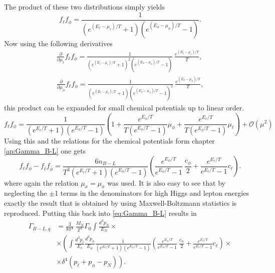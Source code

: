 The product of these two distributions simply yields
\begin{equation*}
	f_\ell f_\phi=\frac{1}{\left(e^{\left(E_\ell-\mu_\ell\right)/T}+1\right)\left(e^{\left(E_\phi-\mu_\phi\right)/T}-1\right)}.
\end{equation*}
Now using the following derivatives
\begin{align*}
	\frac{\partial}{\partial\mu_\ell}f_\ell f_\phi=\frac{1}{\left(e^{\left(E_\ell-\mu_\ell\right)/T}+1\right)^2\left(e^{\left(E_\phi-\mu_\phi\right)/T}-1\right)}\:\frac{e^{\left(E_\ell-\mu_\ell\right)/T}}{T},\\
	\frac{\partial}{\partial\mu_\phi}f_\ell f_\phi=\frac{1}{\left(e^{\left(E_\ell-\mu_\ell\right)/T}+1\right)\left(e^{\left(E_\phi-\mu_\phi\right)/T}-1\right)^2}\:\frac{e^{\left(E_\phi-\mu_\phi\right)/T}}{T},
\end{align*}
this product can be expanded for small chemical potentials up to linear order.
\begin{equation*}
	f_\ell f_\phi=\frac{1}{\left(e^{E_\ell/T}+1\right)\left(e^{E_\phi/T}-1\right)}\left(1+\frac{e^{E_\phi/T}}{T\left(e^{E_\phi/T}-1\right)}\mu_\phi+\frac{e^{E_\ell/T}}{T\left(e^{E_\ell/T}-1\right)}\mu_\ell\right)+\mathcal{O}(\mu^2)
\end{equation*}
Using this and the relations for the chemical potentials form chapter \ref{ap:Gamma_B-L} one gets
\begin{equation*}
	f_\ell f_\phi-f_{\bar{\ell}} f_{\bar{\phi}}=\frac{6n_{B-L}}{T^3\left(e^{E_\ell/T}+1\right)\left(e^{E_\phi/T}-1\right)}\left(\frac{e^{E_\phi/T}}{e^{E_\phi/T}-1}\:\frac{c_\phi}{2}+\frac{e^{E_\ell/T}}{e^{E_\ell/T}-1}c_\ell\right).
\end{equation*}
where again the relation $\mu_x=\mu_{\bar{x}}$ was used. \newline\indent
It is also easy to see that by neglecting the $\pm$1 terms in the denominators for high Higgs and lepton energies exactly the result that is obtained by using Maxwell-Boltzmann statistics is reproduced. \newline\indent
Putting this back into \eqref{eq:Gamma_B-L} results in
\begin{align*}
	\Gamma_{B-L,q}&=\frac{3}{8\pi^4}\:\frac{M_N}{T^3}\Gamma_0\int \frac{d^3p_N}{E_N}\times\\
	&\times\left(\int\frac{d^3p_\ell}{E_\ell}\frac{d^3p_\phi}{E_\phi}\frac{1}{\left(e^{E_\ell/T}+1\right)\left(e^{E_\phi/T}-1\right)}\left(\frac{e^{E_\phi/T}}{e^{E_\phi/T}-1}\:\frac{c_\phi}{2}+\frac{e^{E_\ell/T}}{e^{E_\ell/T}-1}c_\ell\right)\right.\times\\
	&\times\left.\delta^4\left(p_\ell+p_\phi-p_N\right)\right).
\end{align*} 
